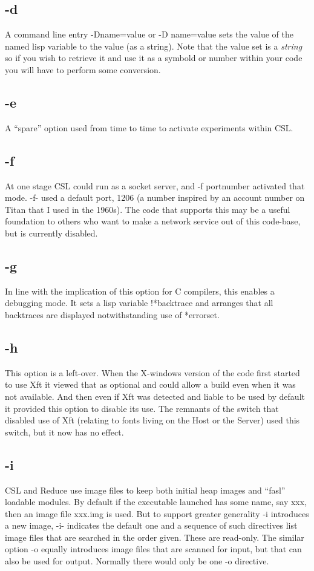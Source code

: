 \documentclass[a4paper,11pt]{article}
\begin{document}
\subsection{\ttfamily -d}
A command line entry {\ttfamily -Dname=value} or {\ttfamily -D name=value}
sets the value of the named lisp variable to the value (as a string).
Note that the value set is a {\em string} so if you wish to retrieve
it and use it as a symbold or number within your code you will have to
perform some conversion.

\subsection{\ttfamily -e}
A ``spare'' option used from time to time to activate experiments within
CSL.

\subsection{\ttfamily -f}
At one stage CSL could run as a socket server, and {\ttfamily -f portnumber}
activated that mode. {\ttfamily -f-} used a default port, 1206 (a number
inspired by an account number on Titan that I used in the 1960s). The code
that supports this may be a useful foundation to others who want to make a
network service out of this code-base, but is currently disabled.

\subsection{\ttfamily -g}
In line with the implication of this option for C compilers, this enables
a debugging mode. It sets a lisp variable {\ttfamily !*backtrace} and
arranges that all backtraces are displayed notwithstanding use of
 *{\ttfamily errorset}.

\subsection{\ttfamily -h}
This option is a left-over. When the X-windows version of the code first
started to use Xft it viewed that as optional and could allow a build even when
it was not available. And then even if Xft was detected and liable to be used
by default it provided this option to disable its use. The remnants of the
switch that disabled use of Xft (relating to fonts living on the Host or
the Server) used this switch, but it now has no effect.

\subsection{\ttfamily -i}
CSL and Reduce use image files to keep both initial heap images and
``fasl'' loadable modules. By default if the executable launched has some name,
say xxx, then an image file xxx.img is used. But to support greater
generality {\ttfamily -i} introduces a new image, {\ttfamily -i-} indicates
the default one and a sequence of such directives list image files that are
searched in the order given. These are read-only. The similar option
{\ttfamily -o} equally introduces image files that are scanned for input, but
that can also be used for output. Normally there would only be one
{\ttfamily -o} directive.
\end{document}
